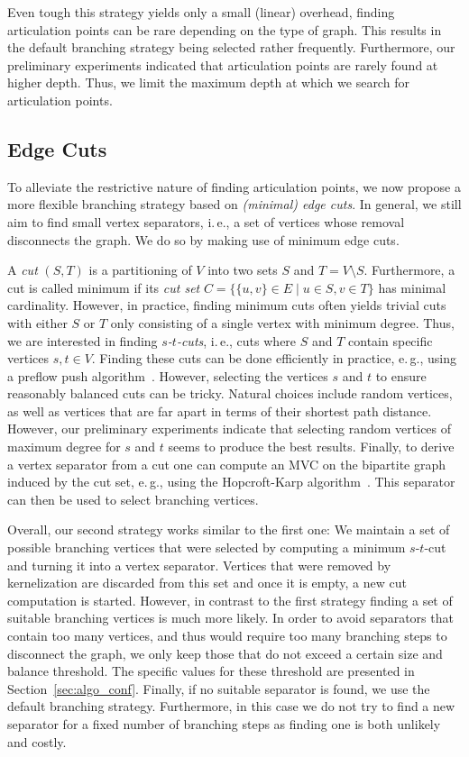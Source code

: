 \documentclass[a4paper,UKenglish,cleveref, autoref, thm-restate]{lipics-v2021}
\newcommand{\ie}{i.\,e.,\xspace}
\newcommand{\eg}{e.\,g.,\xspace}
\begin{document}
Even tough this strategy yields only a small (linear) overhead, finding articulation points can be rare depending on the type of graph.
This results in the default branching strategy being selected rather
frequently.
Furthermore, our preliminary experiments indicated that articulation points are rarely found at higher depth.
Thus, we limit the maximum depth at which we search for articulation points.

\subsection{Edge Cuts}
To alleviate the restrictive nature of finding articulation points, we now propose a more flexible branching strategy based on \emph{(minimal) edge cuts}.
In general, we still aim to find small vertex separators, \ie a set of vertices whose removal disconnects the graph.
We do so by making use of minimum edge cuts.

A \emph{cut} $(S,T)$ is a partitioning of $V$ into two sets $S$ and $T=V\setminus S$.
Furthermore, a cut is called minimum if its \emph{cut set} $C = \{\{u,v\} \in E \mid u \in S, v \in T\}$ has minimal cardinality.
However, in practice, finding minimum cuts often yields trivial cuts with either $S$ or $T$ only consisting of a single vertex with minimum degree. 
Thus, we are interested in finding \emph{$s$-$t$-cuts}, \ie cuts where $S$ and $T$ contain specific vertices $s,t \in V$.
Finding these cuts can be done efficiently in practice, \eg using a preflow push algorithm~\cite{goldberg1988new}.
However, selecting the vertices $s$ and $t$ to ensure reasonably balanced cuts can be tricky.
Natural choices include random vertices, as well as vertices that are far apart in terms of their shortest path distance.
However, our preliminary experiments indicate that selecting random vertices of maximum degree
 for $s$ and $t$ seems to produce the best results.
Finally, to derive a vertex separator from a cut one can compute an MVC on the bipartite graph induced by the cut set, \eg using the Hopcroft-Karp algorithm~\cite{hopcroft1973n}.
This separator can then be used to select branching vertices.

Overall, our second strategy works similar to the first one: We maintain a set of possible branching vertices that were selected by computing a minimum $s$-$t$-cut and turning it into a vertex separator.
Vertices that were removed by kernelization are discarded from this set and once it is empty, a new cut computation is started.
However, in contrast to the first strategy finding a set of suitable branching vertices is much more likely.
In order to avoid separators that contain too many vertices, and thus would require too many branching steps to disconnect the graph, we only keep those that do not exceed a certain size and balance threshold.
The specific values for these threshold are presented in Section~\ref{sec:algo_conf}.
Finally, if no suitable separator is found, we use the default branching strategy.
Furthermore, in this case we do not try to find a new separator for a fixed number of branching steps as finding one is both unlikely and costly.
\end{document}
